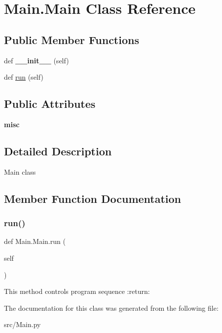 \hypertarget{class_main_1_1_main}{}\section{Main.\+Main Class Reference}
\label{class_main_1_1_main}
\subsection*{Public Member Functions}
\begin{DoxyCompactItemize}
\item 
\mbox{\label{class_main_1_1_main_a25ab3329d16c1a94a9c9f8a2f5de404a}} 
def {\bfseries \+\_\+\+\_\+init\+\_\+\+\_\+} (self)
\item 
def \mbox{\hyperlink{class_main_1_1_main_ab9b18db6a7f0e5b336228e11d969bb76}{run}} (self)
\end{DoxyCompactItemize}
\subsection*{Public Attributes}
\begin{DoxyCompactItemize}
\item 
\mbox{\label{class_main_1_1_main_ac73e82b384a9f932e60a1bd9de6928a1}} 
{\bfseries misc}
\end{DoxyCompactItemize}


\subsection{Detailed Description}
\begin{DoxyVerb}Main class
\end{DoxyVerb}
 

\subsection{Member Function Documentation}
\mbox{\label{class_main_1_1_main_ab9b18db6a7f0e5b336228e11d969bb76}} 
\subsubsection{\texorpdfstring{run()}{run()}}
{\footnotesize\ttfamily def Main.\+Main.\+run (\begin{DoxyParamCaption}\item[{}]{self }\end{DoxyParamCaption})}

\begin{DoxyVerb}This method controls program sequence
:return:
\end{DoxyVerb}
 

The documentation for this class was generated from the following file\+:\begin{DoxyCompactItemize}
\item 
src/Main.\+py\end{DoxyCompactItemize}
